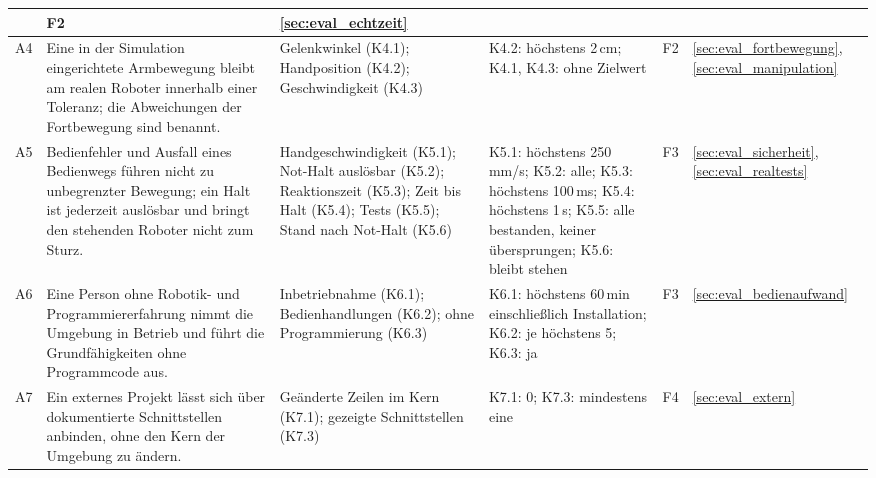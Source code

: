 \begin{table}[htbp]
\begin{tabularx}{\textwidth}{|P{0.8cm}|L|P{3.2cm}|P{3.3cm}|P{1.2cm}|P{1.8cm}|}
        &
        F2 &
        \ref{sec:eval_echtzeit}\\\hline
        A4 &
        Eine in der Simulation eingerichtete Armbewegung bleibt am realen Roboter innerhalb einer Toleranz; die Abweichungen der Fortbewegung sind benannt. &
        Gelenkwinkel (K4.1); Handposition (K4.2); Geschwindigkeit (K4.3) &
        K4.2: höchstens 2\,cm; %
        K4.1, K4.3: ohne Zielwert &
        F2 &
        \ref{sec:eval_fortbewegung}, \ref{sec:eval_manipulation}\\\hline
        A5 &
        Bedienfehler und Ausfall eines Bedienwegs führen nicht zu unbegrenzter Bewegung; ein Halt ist jederzeit auslösbar und bringt den stehenden Roboter nicht zum Sturz. &
        Handgeschwindigkeit (K5.1); Not-Halt auslösbar (K5.2); Reaktionszeit (K5.3); Zeit bis Halt (K5.4); Tests (K5.5); Stand nach Not-Halt (K5.6) &
        K5.1: höchstens 250\,mm/s; %
        K5.2: alle; K5.3: höchstens 100\,ms; %
        K5.4: höchstens 1\,s; %
        K5.5: alle bestanden, keiner übersprungen; K5.6: bleibt stehen &
        F3 &
        \ref{sec:eval_sicherheit}, \ref{sec:eval_realtests}\\\hline
        A6 &
        Eine Person ohne Robotik- und Programmiererfahrung nimmt die Umgebung in Betrieb und führt die Grundfähigkeiten ohne Programmcode aus. &
        Inbetriebnahme (K6.1); Bedienhandlungen (K6.2); ohne Programmierung (K6.3) &
        K6.1: höchstens 60\,min einschließlich Installation; %
        K6.2: je höchstens 5; %
        K6.3: ja &
        F3 &
        \ref{sec:eval_bedienaufwand}\\\hline
        A7 &
        Ein externes Projekt lässt sich über dokumentierte Schnittstellen anbinden, ohne den Kern der Umgebung zu ändern. &
        Geänderte Zeilen im Kern (K7.1); gezeigte Schnittstellen (K7.3) &
        K7.1: 0; K7.3: mindestens eine &
        F4 &
        \ref{sec:eval_extern}\\\hline
    \end{tabularx}
\end{table}

